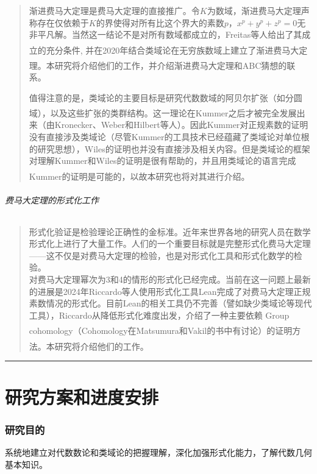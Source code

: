 \documentclass{article}
\newcommand{\upcite}[1]{\textsuperscript{\textsuperscript{\cite{#1}}}}
\begin{document}
\begin{quote}
渐进费马大定理是费马大定理的直接推广。令$K$为数域，渐进费马大定理声称存在仅依赖于$K$的界使得对所有比这个界大的素数$p$，$x^p + y^p + z^p=0$无非平凡解。当然这一结论不是对所有数域都成立的，Freitas等人给出了其成立的充分条件\upcite{ref13}, 并在2020年结合类域论在无穷族数域上建立了渐进费马大定理\upcite{ref10}。本研究将介绍他们的工作，并介绍渐进费马大定理和ABC猜想的联系。

值得注意的是，类域论的主要目标是研究代数数域的阿贝尔扩张（如分圆域）\upcite{ref6}，以及这些扩张的类群结构\upcite{ref4}。这一理论在Kummer之后才被完全发展出来（由Kronecker、Weber和Hilbert等人）。因此Kummer对正规素数的证明没有直接涉及类域论（尽管Kummer的工具技术已经蕴藏了类域论对单位根的研究思想），Wiles的证明也并没有直接涉及相关内容。但是类域论的框架对理解Kummer和Wiles的证明是很有帮助的，并且用类域论的语言完成Kummer的证明是可能的\upcite{ref14}，以故本研究也将对其进行介绍。
\end{quote}

\paragraph{费马大定理的形式化工作}

\begin{quote}
形式化验证是检验理论正确性的金标准。近年来世界各地的研究人员在数学形式化上进行了大量工作。人们的一个重要目标就是完整形式化费马大定理——这不仅是对费马大定理的检验，也是对形式化工具和形式化数学的检验。\\

对费马大定理幂次为3和4的情形的形式化已经完成。当前在这一问题上最新的进展是2024年Riccardo等人使用形式化工具Lean完成了对费马大定理正规素数情况的形式化。目前Lean的相关工具仍不完善（譬如缺少类域论等现代工具），Riccardo从降低形式化难度出发，介绍了一种主要依赖 Group cohomology（Cohomology在Matsumura\upcite{ref5}和Vakil\upcite{ref7}的书中有讨论）的证明方法。本研究将介绍他们的工作\upcite{ref12}。
\end{quote}

\newpage
\hrule
\part{研究方案和进度安排}

\setcounter{section}{0}
\section{研究目的}

\noindent
系统地建立对代数数论和类域论的把握理解，深化加强形式化能力，了解代数几何基本知识。
\end{document}
